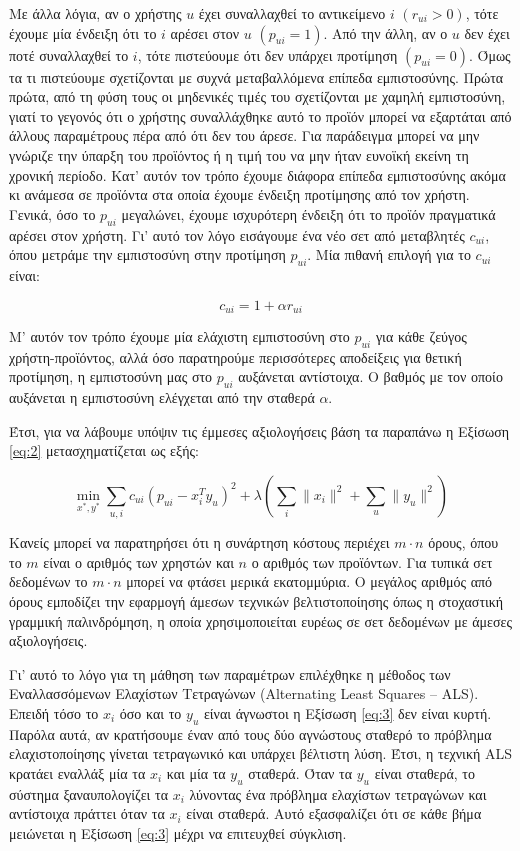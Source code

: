 Με άλλα λόγια, αν ο χρήστης $u$ έχει συναλλαχθεί το αντικείμενο $i$ $\left(r_{ui}>0\right)$, τότε έχουμε μία ένδειξη ότι το $i$ αρέσει στον $u$ $\left(p_{ui}=1\right)$. Από την άλλη, αν ο $u$ δεν έχει ποτέ συναλλαχθεί το $i$, τότε πιστεύουμε ότι δεν υπάρχει προτίμηση $\left(p_{ui}=0\right)$. Όμως τα τι πιστεύουμε σχετίζονται με συχνά μεταβαλλόμενα επίπεδα εμπιστοσύνης. Πρώτα πρώτα, από τη φύση τους οι μηδενικές τιμές του  σχετίζονται με χαμηλή εμπιστοσύνη, γιατί το γεγονός ότι ο χρήστης συναλλάχθηκε αυτό το προϊόν μπορεί να εξαρτάται από άλλους παραμέτρους πέρα από ότι δεν του άρεσε. Για παράδειγμα μπορεί να μην γνώριζε την ύπαρξη του προϊόντος ή η τιμή του να μην ήταν ευνοϊκή εκείνη τη χρονική περίοδο. Κατ’ αυτόν τον τρόπο έχουμε διάφορα επίπεδα εμπιστοσύνης ακόμα κι ανάμεσα σε προϊόντα στα οποία έχουμε ένδειξη προτίμησης από τον χρήστη. Γενικά, όσο το $p_{ui}$ μεγαλώνει, έχουμε ισχυρότερη ένδειξη ότι το προϊόν πραγματικά αρέσει στον χρήστη. Γι’ αυτό τον λόγο εισάγουμε ένα νέο σετ από μεταβλητές $c_{ui}$, όπου μετράμε την εμπιστοσύνη στην προτίμηση $p_{ui}$. Μία πιθανή επιλογή για το $c_{ui}$ είναι:

\begin{equation*}
	c_{ui}=1+\alpha r_{ui}
\end{equation*}

Μ’ αυτόν τον τρόπο έχουμε μία ελάχιστη εμπιστοσύνη στο $p_{ui}$ για κάθε ζεύγος χρήστη-προϊόντος, αλλά όσο παρατηρούμε περισσότερες αποδείξεις για θετική προτίμηση, η εμπιστοσύνη μας στο $p_{ui}$ αυξάνεται αντίστοιχα. Ο βαθμός με τον οποίο αυξάνεται η εμπιστοσύνη ελέγχεται από την σταθερά $\alpha$. 

Έτσι, για να λάβουμε υπόψιν τις έμμεσες αξιολογήσεις βάση τα παραπάνω η Εξίσωση \eqref{eq:2} μετασχηματίζεται ως εξής:

\begin{equation}
	\min_{x^*,y^*}\sum_{u,i} c_{ui}\left(p_{ui}-x_i^Ty_u \right)^2+\lambda\left(\sum_i\|x_i\|^2+\sum_u\|y_u\|^2\right)\label{eq:3}
\end{equation}

Κανείς μπορεί να παρατηρήσει ότι η συνάρτηση κόστους περιέχει $m \cdot n$ όρους, όπου το $m$ είναι ο αριθμός των χρηστών και $n$ ο αριθμός των προϊόντων. Για τυπικά σετ δεδομένων το $m \cdot n$ μπορεί να φτάσει μερικά εκατομμύρια. Ο μεγάλος αριθμός από όρους εμποδίζει την εφαρμογή άμεσων τεχνικών βελτιστοποίησης όπως η στοχαστική γραμμική παλινδρόμηση, η οποία χρησιμοποιείται ευρέως σε σετ δεδομένων με άμεσες αξιολογήσεις. 

Γι’ αυτό το λόγο για τη μάθηση των παραμέτρων επιλέχθηκε η μέθοδος των Εναλλασσόμενων Ελαχίστων Τετραγώνων (Alternating Least Squares – ALS). Επειδή τόσο το $x_i$ όσο και το $y_u$ είναι άγνωστοι η Εξίσωση \eqref{eq:3} δεν είναι κυρτή. Παρόλα αυτά, αν κρατήσουμε έναν από τους δύο αγνώστους σταθερό το πρόβλημα ελαχιστοποίησης γίνεται τετραγωνικό και υπάρχει βέλτιστη λύση. Έτσι, η τεχνική ALS κρατάει εναλλάξ μία τα $x_i$ και μία τα $y_u$ σταθερά. Όταν τα $y_u$ είναι σταθερά, το σύστημα ξαναυπολογίζει τα $x_i$ λύνοντας ένα πρόβλημα ελαχίστων τετραγώνων και αντίστοιχα πράττει όταν τα $x_i$ είναι σταθερά. Αυτό εξασφαλίζει ότι σε κάθε βήμα μειώνεται η Εξίσωση \eqref{eq:3} μέχρι να επιτευχθεί σύγκλιση.
